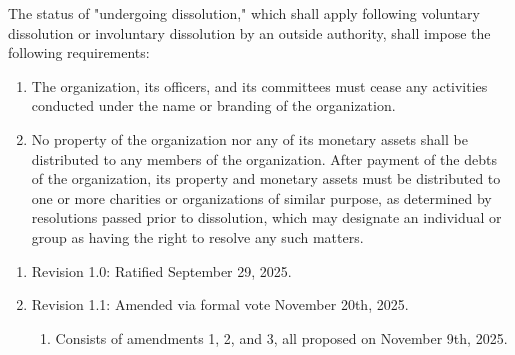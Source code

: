 \documentclass[11pt]{article}
\newcounter{h1}
\newcounter{h2}[h1]
\newcounter{h3}[h2]
\begin{document}

The status of "undergoing dissolution," which shall apply following voluntary dissolution or involuntary dissolution by an outside authority, shall impose the following requirements:

\begin{enumerate}
  \item The organization, its officers, and its committees must cease any activities conducted under the name or branding of the organization.  
  \item No property of the organization nor any of its monetary assets shall be distributed to any members of the organization. After payment of the debts of the organization, its property and monetary assets must be distributed to one or more charities or organizations of similar purpose, as determined by resolutions passed prior to dissolution, which may designate an individual or group as having the right to resolve any such matters.
\end{enumerate}


\begin{enumerate}
  \item Revision 1.0: Ratified September 29, 2025.  
  \item Revision 1.1: Amended via formal vote November 20th, 2025.  
  \begin{enumerate}
    \item Consists of amendments 1, 2, and 3, all proposed on November 9th, 2025.
  \end{enumerate}
\end{enumerate}
\end{document}
